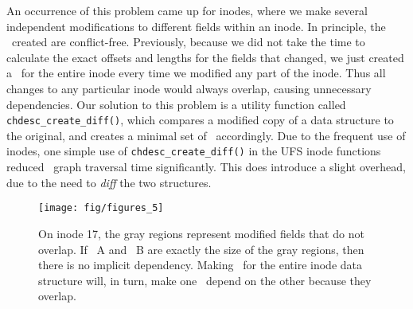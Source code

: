 An occurrence of this problem came up for inodes, where we make several
independent modifications to different fields within an inode. In principle,
the \chdescs\ created are conflict-free. Previously, because we did not take
the time to calculate the exact offsets and lengths for the fields that
changed, we just created a \chdesc\ for the entire inode every time we modified
any part of the inode. Thus all changes to any particular inode would always
overlap, causing unnecessary dependencies. Our solution to this problem is a
utility function called \texttt{chdesc\_create\_diff()}, which compares a
modified copy of a data structure to the original, and creates a minimal set of
\chdescs\ accordingly. Due to the frequent use of inodes, one simple use of
\texttt{chdesc\_create\_diff()} in the UFS inode functions reduced \chdesc\
graph traversal time significantly. This does introduce a slight
overhead, due to the need to \emph{diff} the two structures.

\begin{figure}[htb]
  \centering
  \texttt{[image: fig/figures\_5]}
  \caption{\label{fig:overlap} On inode 17, the gray regions represent
  modified fields that do not overlap. If \chdesc\ A and \chdesc\ B are
  exactly the size of the gray regions, then there is no implicit dependency.
  Making \chdescs\ for the entire inode data structure will, in turn, make
  one \chdesc\ depend on the other because they overlap.}
\end{figure}


